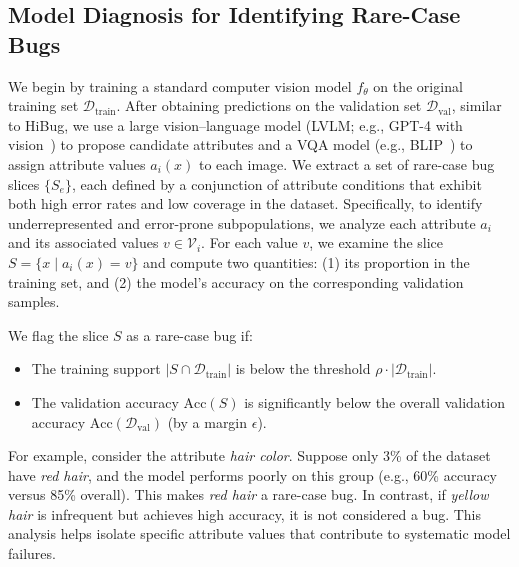 \documentclass[10pt]{article} %
\newcommand{\hibug}{HiBug\xspace}
\begin{document}
\subsection{Model Diagnosis for Identifying Rare-Case Bugs}
We begin by training a standard computer vision model \(f_\theta\) on the original training set \(\mathcal{D}_{\mathrm{train}}\). After obtaining predictions on the validation set \(\mathcal{D}_{\mathrm{val}}\), similar to \hibug{}, we use a large vision--language model (LVLM; e.g., GPT-4 with vision~\citep{openai2023gpt4}) to propose candidate attributes and a VQA model (e.g., BLIP~\citep{li2022blip}) to assign attribute values \(a_i(x)\) to each image. We extract a set of rare-case bug slices \(\{S_e\}\), each defined by a conjunction of attribute conditions that exhibit both high error rates and low coverage in the dataset. Specifically, to identify underrepresented and error-prone subpopulations, we analyze each attribute \(a_i\) and its associated values \(v \in \mathcal{V}_i\). For each value \(v\), we examine the slice \(S = \{x \mid a_i(x) = v\}\) and compute two quantities: (1) its proportion in the training set, and (2) the model’s accuracy on the corresponding validation samples.

\noindent We flag the slice \(S\) as a rare-case bug if:
\begin{itemize}
    \item The training support \(|S \cap \mathcal{D}_{\mathrm{train}}|\) is below the threshold \(\rho \cdot |\mathcal{D}_{\mathrm{train}}|\).
    \item The validation accuracy \(\mathrm{Acc}(S)\) is significantly below the overall validation accuracy \(\mathrm{Acc}(\mathcal{D}_{\mathrm{val}})\) (by a margin \(\epsilon\)).
\end{itemize}
For example, consider the attribute \textit{hair color}. Suppose only 3\% of the dataset have \textit{red hair}, and the model performs poorly on this group (e.g., 60\% accuracy versus 85\% overall). This makes \textit{red hair} a rare-case bug. In contrast, if \textit{yellow hair} is infrequent but achieves high accuracy, it is not considered a bug. This analysis helps isolate specific attribute values that contribute to systematic model failures.

\end{document}
